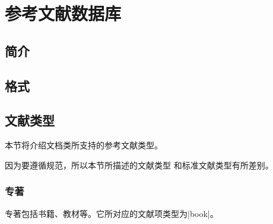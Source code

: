 
\chapter{参考文献数据库}\label{chap:bib}

\section{简介}\label{sec:bib-intro}


\section{格式}\label{sec:bib-format}

\section{文献类型}\label{sec:bib-type}

本节将介绍{\njuthesis}文档类所支持的参考文献类型。

\begin{note}
因为要遵循规范\cite{gbt7714-2005}，所以本节所描述的文献类型
和标准{\BibTeX}文献类型有所差别。
\end{note}

\subsection{专著}\label{subsec:bibtype-book}

专著包括书籍、教材等。它所对应的{\BibTeX}文献项类型为|book|。

